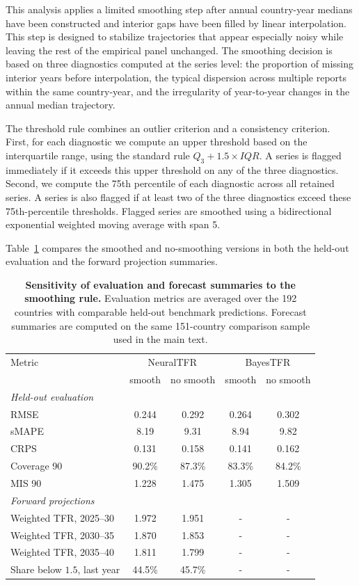 \documentclass[12pt]{article}
\begin{document}
This analysis applies a limited smoothing step after annual country-year medians have been constructed and interior gaps have been filled by linear interpolation. This step is designed to stabilize trajectories that appear especially noisy while leaving the rest of the empirical panel unchanged. The smoothing decision is based on three diagnostics computed at the series level: the proportion of missing interior years before interpolation, the typical dispersion across multiple reports within the same country-year, and the irregularity of year-to-year changes in the annual median trajectory.

The threshold rule combines an outlier criterion and a consistency criterion. First, for each diagnostic we compute an upper threshold based on the interquartile range, using the standard rule $Q_3 + 1.5 \times IQR$. A series is flagged immediately if it exceeds this upper threshold on any of the three diagnostics. Second, we compute the 75th percentile of each diagnostic across all retained series. A series is also flagged if at least two of the three diagnostics exceed these 75th-percentile thresholds. Flagged series are smoothed using a bidirectional exponential weighted moving average with span 5.

Table~\ref{tab:smoothing_sensitivity} compares the smoothed and no-smoothing versions in both the held-out evaluation and the forward projection summaries.

\begin{table}[H]
\centering
\footnotesize
\setlength{\tabcolsep}{4pt}
\caption{\textbf{Sensitivity of evaluation and forecast summaries to the smoothing rule.} Evaluation metrics are averaged over the 192 countries with comparable held-out benchmark predictions. Forecast summaries are computed on the same 151-country comparison sample used in the main text.}
\label{tab:smoothing_sensitivity}
\begin{tabular}{lcccc}
\toprule
Metric & \multicolumn{2}{c}{NeuralTFR} & \multicolumn{2}{c}{BayesTFR} \\
 & smooth & no smooth & smooth & no smooth \\
\midrule
\multicolumn{5}{l}{\textit{Held-out evaluation}} \\
RMSE & 0.244 & 0.292 & 0.264 & 0.302 \\
sMAPE & 8.19 & 9.31 & 8.94 & 9.82 \\
CRPS & 0.131 & 0.158 & 0.141 & 0.162 \\
Coverage 90 & 90.2\% & 87.3\% & 83.3\% & 84.2\% \\
MIS 90 & 1.228 & 1.475 & 1.305 & 1.509 \\
\midrule
\multicolumn{5}{l}{\textit{Forward projections}} \\
Weighted TFR, 2025--30 & 1.972 & 1.951 & - & - \\
Weighted TFR, 2030--35 & 1.870 & 1.853 & - & - \\
Weighted TFR, 2035--40 & 1.811 & 1.799 & - & - \\
Share below $1.5$, last year & 44.5\% & 45.7\% & - & - \\
\bottomrule
\end{tabular}
\end{table}
\end{document}
